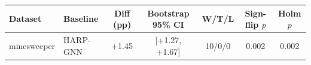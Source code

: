 \begin{tabular}{llccccc}
\toprule
Dataset & Baseline & Diff (pp) & Bootstrap 95\% CI & W/T/L & Sign-flip $p$ & Holm $p$ \\
\midrule
minesweeper & HARP-GNN & +1.45 & [+1.27, +1.67] & 10/0/0 & 0.002 & 0.002 \\
\bottomrule
\end{tabular}
